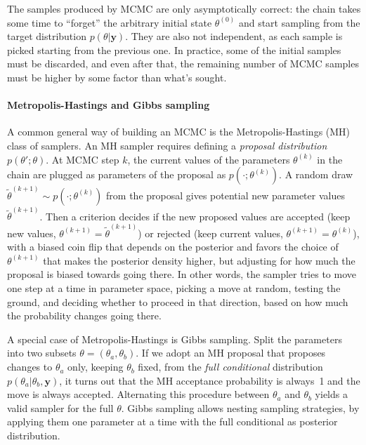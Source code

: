 \documentclass{article}
\begin{document}
The samples produced by MCMC are only asymptotically correct: the chain takes
some time to ``forget'' the arbitrary initial state $\theta^{(0)}$ and start
sampling from the target distribution $p(\theta|\mathbf y)$. They are also not
independent, as each sample is picked starting from the previous one. In
practice, some of the initial samples must be discarded, and even after that,
the remaining number of MCMC samples must be higher by some factor than what's
sought.

\paragraph{Metropolis-Hastings and Gibbs sampling}

A common general way of building an MCMC is the Metropolis-Hastings (MH) class of
samplers. An MH sampler requires defining a \emph{proposal distribution}
$p(\theta';\theta)$. At MCMC step $k$, the current values of the parameters
$\theta^{(k)}$ in the chain are plugged as parameters of the proposal as
$p(\cdot;\theta^{(k)})$. A random draw $\tilde\theta^{(k+1)}\sim
	p(\cdot;\theta^{(k)})$ from the proposal gives potential new parameter values
$\tilde\theta^{(k+1)}$. Then a criterion decides if the new proposed values are
accepted (keep new values, $\theta^{(k+1)} = \tilde\theta^{(k+1)}$) or rejected
(keep current values, $\theta^{(k+1)} = \theta^{(k)}$), with a biased coin flip
that depends on the posterior and favors the choice of $\theta^{(k+1)}$ that
makes the posterior density higher, but adjusting for how much the proposal is biased towards going there. In other words, the sampler tries to move
one step at a time in parameter space, picking a move at random, testing the
ground, and deciding whether to proceed in that direction, based on how much the
probability changes going there.

A special case of Metropolis-Hastings is Gibbs sampling. Split the parameters into
two subsets $\theta = (\theta_a, \theta_b)$. If we adopt an MH proposal that
proposes changes to $\theta_a$ only, keeping $\theta_b$ fixed, from the
\emph{full conditional} distribution $p(\theta_a|\theta_b,\mathbf y)$, it turns
out that the MH acceptance probability is always~1 and the move is always
accepted. Alternating this procedure between $\theta_a$ and $\theta_b$ yields a
valid sampler for the full $\theta$. Gibbs sampling allows nesting sampling
strategies, by applying them one parameter at a time with the full conditional
as posterior distribution.
\end{document}

